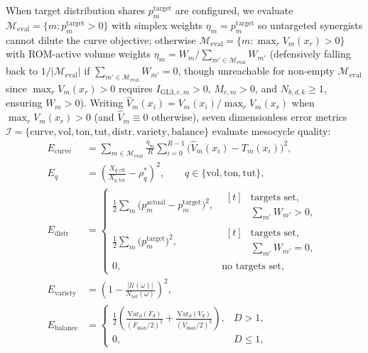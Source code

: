 \documentclass[10pt,twocolumn,letterpaper]{article}
\theoremstyle{plain}
\theoremstyle{definition}
\begin{document}
When target distribution shares $p_m^{\mathrm{target}}$ are configured, we evaluate $\mathcal{M}_{\mathrm{eval}} = \{m : p_m^{\mathrm{target}} > 0\}$ with simplex weights $\eta_m = p_m^{\mathrm{target}}$ so untargeted synergists cannot dilute the curve objective; otherwise $\mathcal{M}_{\mathrm{eval}} = \{m : \max_r V_m(x_r) > 0\}$ with ROM-active volume weights $\eta_m = W_m / \sum_{m' \in \mathcal{M}_{\mathrm{eval}}} W_{m'}$ (defensively falling back to $1/|\mathcal{M}_{\mathrm{eval}}|$ if $\sum_{m' \in \mathcal{M}_{\mathrm{eval}}} W_{m'} = 0$, though unreachable for non-empty $\mathcal{M}_{\mathrm{eval}}$ since $\max_r V_m(x_r) > 0$ requires $I_{\mathrm{GL3},e,m} > 0$, $M_{e,m} > 0$, and $N_{b,d,k} \ge 1$, ensuring $W_m > 0$). Writing $\hat{V}_m(x_i) = V_m(x_i)/\max_r V_m(x_r)$ when $\max_r V_m(x_r) > 0$ (and $\hat{V}_m \equiv 0$ otherwise), seven dimensionless error metrics $\mathcal{I} = \{\mathrm{curve}, \mathrm{vol}, \mathrm{ton}, \mathrm{tut}, \mathrm{distr}, \mathrm{variety}, \mathrm{balance}\}$ evaluate mesocycle quality:
\begin{align}
  E_{\mathrm{curve}} &= \sum_{m \in \mathcal{M}_{\mathrm{eval}}} \frac{\eta_m}{R} \sum_{i=0}^{R-1} \bigl( \hat{V}_m(x_i) - T_m(x_i) \bigr)^2, \\
  E_q &= \left( \frac{X_{q,\mathrm{eff}}}{X_{q,\mathrm{tot}}} - \rho_q^* \right)^2, \qquad q \in \{\mathrm{vol}, \mathrm{ton}, \mathrm{tut}\}, \\
  E_{\mathrm{distr}} &= \begin{cases}
    \frac{1}{2} \sum_{m} \bigl( p_m^{\mathrm{actual}} - p_m^{\mathrm{target}} \bigr)^2, &
    \begin{aligned}[t]
      &\text{targets set,} \\
      &\textstyle\sum_{m'} W_{m'} > 0,
    \end{aligned} \\
    \frac{1}{2} \sum_{m} \bigl( p_m^{\mathrm{target}} \bigr)^2, &
    \begin{aligned}[t]
      &\text{targets set,} \\
      &\textstyle\sum_{m'} W_{m'} = 0,
    \end{aligned} \\
    0, & \text{no targets set},
  \end{cases} \\
  E_{\mathrm{variety}} &= \left( 1 - \frac{|\mathcal{U}(\omega)|}{N_{\mathrm{tot}}(\omega)} \right)^2, \\
  E_{\mathrm{balance}} &= \begin{cases}
    \frac{1}{2} \left( \frac{\mathrm{Var}_d(F_d)}{(F_{\max}/2)^2} + \frac{\mathrm{Var}_d(V_d)}{(V_{\max}/2)^2} \right), & D > 1, \\
    0, & D \le 1,
  \end{cases}
\end{align}
\end{document}
